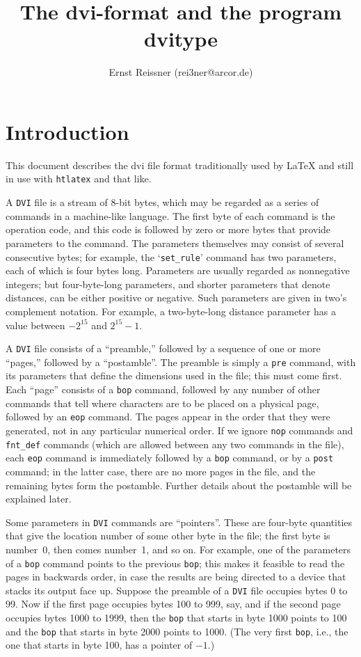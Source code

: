 \documentclass{article}
\title{The dvi-format and the program dvitype}
\author{Ernst Reissner (rei3ner@arcor.de)}
\begin{document}
\maketitle
\tableofcontents

\section{Introduction}
This document describes the dvi file format 
traditionally used by \LaTeX{} 
and still in use with \texttt{htlatex} and that like. 


A \texttt{DVI} file is a stream of 8-bit bytes, which may be regarded as a
series of commands in a machine-like language. The first byte of each command
is the operation code, and this code is followed by zero or more bytes
that provide parameters to the command. The parameters themselves may consist
of several consecutive bytes; 
for example, the `\texttt{set\_rule}' command has two
parameters, each of which is four bytes long. Parameters are usually
regarded as nonnegative integers; but four-byte-long parameters,
and shorter parameters that denote distances, can be
either positive or negative. Such parameters are given in two's complement
notation. For example, a two-byte-long distance parameter has a value between
$-2^{15}$ and $2^{15}-1$.


A \texttt{DVI} file consists of a ``preamble,'' 
followed by a sequence of one or more ``pages,'' 
followed by a ``postamble''. 
The preamble is simply a \texttt{pre} command, 
with its parameters that define the dimensions used in the file; 
this must come first.  
Each ``page'' consists of a \texttt{bop} command,
followed by any number of other commands that tell where characters are to
be placed on a physical page, followed by an \texttt{eop} command. 
The pages appear in the order that they were generated, 
not in any particular numerical order. 
If we ignore \texttt{nop} commands and \texttt{fnt\_def} commands
(which are allowed between any two commands in the file), 
each \texttt{eop} command is immediately followed by a \texttt{bop} command, 
or by a \texttt{post} command; 
in the latter case, there are no more pages in the file, 
and the remaining bytes form the postamble.  
Further details about the postamble will be explained later.

Some parameters in \texttt{DVI} commands are ``pointers''. 
These are four-byte quantities that give the location number 
of some other byte in the file; 
the first byte is number~0, then comes number~1, and so on. 
For example, one of the parameters of a \texttt{bop} command 
points to the previous \texttt{bop};
this makes it feasible to read the pages in backwards order, 
in case the results are being directed to a device 
that stacks its output face up. 
Suppose the preamble of a \texttt{DVI} file occupies bytes 0 to 99. 
Now if the first page occupies bytes 100 to 999, say, 
and if the second page occupies bytes 1000 to 1999, 
then the \texttt{bop} that starts in byte 1000
points to 100 and the \texttt{bop} that starts in byte 2000 points to 1000. 
(The very first \texttt{bop}, 
i.e., the one that starts in byte 100, has a pointer of $-1$.)
\end{document}
